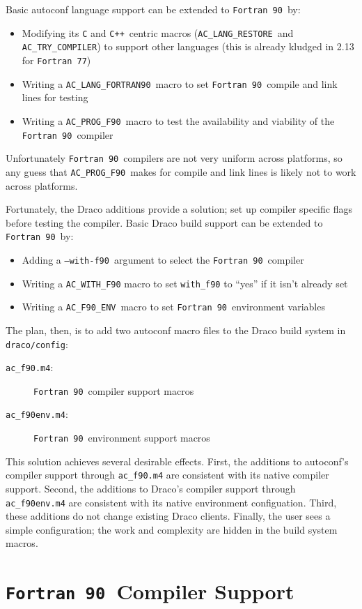 \documentclass[11pt]{nmemo}
\newcommand{\fninety}{\texttt{Fortran~90}}
\newcommand{\cpp}{\texttt{C++}}
\newcommand{\withfninety}{\texttt{--with-f90}}
\newcommand{\fninetyenv}{\texttt{AC\_F90\_ENV}}
\newcommand{\langfninety}{\texttt{AC\_LANG\_FORTRAN90}}
\newcommand{\progfninety}{\texttt{AC\_PROG\_F90}}
\newcommand{\fseventyseven}{\texttt{Fortran 77}}
\newcommand{\langrestore}{\texttt{AC\_LANG\_RESTORE}}
\begin{document}
Basic autoconf language support can be extended to \fninety\ by:
\begin{itemize}
\item Modifying its \texttt{C} and \cpp\ centric macros (\langrestore\
and \texttt{AC\_TRY\_COMPILER}) to support other languages (this is
already kludged in 2.13 for \fseventyseven)
\item Writing a \langfninety\ macro to set \fninety\ compile and link
lines for testing
\item Writing a \progfninety\ macro to test the availability and
viability of the \fninety\ compiler
\end{itemize}
Unfortunately \fninety\ compilers are not very uniform across
platforms, so any guess that \progfninety\ makes for compile and link
lines is likely not to work across platforms.  

Fortunately, the Draco additions provide a solution; set up compiler
specific flags before testing the compiler.  Basic Draco build support
can be extended to \fninety\ by:
\begin{itemize}
\item Adding a \withfninety\ argument to select the \fninety\ compiler
\item Writing a \texttt{AC\_WITH\_F90} macro to set \texttt{with\_f90}
to ``yes'' if it isn't already set
\item Writing a \fninetyenv\ macro to set \fninety\ environment
variables
\end{itemize}

The plan, then, is to add two autoconf macro files to the Draco build
system in \texttt{draco/config}:
\begin{description}
\item[\texttt{ac\_f90.m4}:] \fninety\ compiler support macros
\item[\texttt{ac\_f90env.m4}:] \fninety\ environment support macros
\end{description}
This solution achieves several desirable effects.  First, the
additions to autoconf's compiler support through \texttt{ac\_f90.m4}
are consistent with its native compiler support.  Second, the
additions to Draco's compiler support through \texttt{ac\_f90env.m4}
are consistent with its native environment configuation.  Third, these
additions do not change existing Draco clients.  Finally, the user
sees a simple configuration; the work and complexity are hidden in the
build system macros.

\section{\fninety\ Compiler Support}
\end{document}
